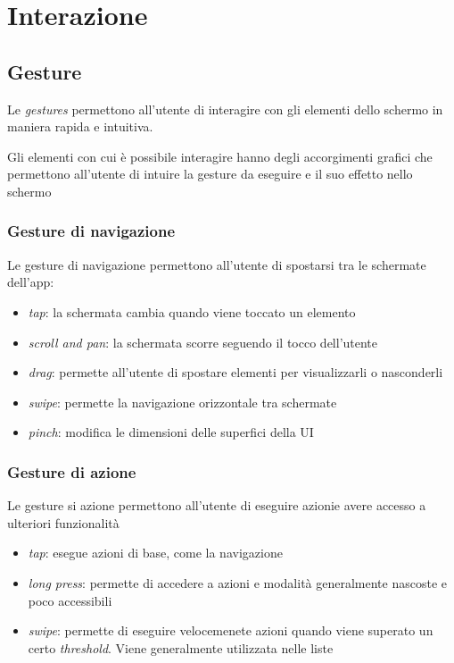 \documentclass[12pt, a4paper]{report}
\begin{document}
	\section{Interazione}

		\subsection{Gesture}	
		Le \textit{gestures} permettono all'utente di interagire con gli elementi dello schermo in maniera rapida e intuitiva.
		
		Gli elementi con cui è possibile interagire hanno degli accorgimenti grafici che permettono all'utente di intuire la gesture da eseguire e il suo effetto nello schermo
		
			\subsubsection{Gesture di navigazione}
			Le gesture di navigazione permettono all'utente di spostarsi tra le schermate dell'app:
			\begin{itemize}
				\item \textit{tap}: la schermata cambia quando viene toccato un elemento
				\item \textit{scroll and pan}: la schermata scorre seguendo il tocco dell'utente
				\item \textit{drag}: permette all'utente di spostare elementi per visualizzarli o nasconderli
				\item \textit{swipe}: permette la navigazione orizzontale tra schermate
				\item \textit{pinch}: modifica le dimensioni delle superfici della UI
			\end{itemize}
			
			\subsubsection{Gesture di azione}
			Le gesture si azione permettono all'utente di eseguire azionie avere accesso a ulteriori funzionalità
			\begin{itemize}
				\item \textit{tap}: esegue azioni di base, come la navigazione 
				\item \textit{long press}: permette di accedere a azioni e modalità generalmente nascoste e poco accessibili
				\item \textit{swipe}: permette di eseguire velocemenete azioni quando viene superato un certo \textit{threshold}. Viene generalmente utilizzata nelle liste
			\end{itemize}
			
\end{document}
